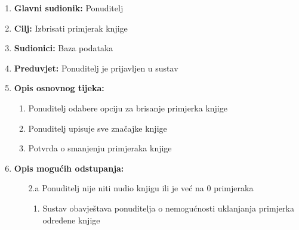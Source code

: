 \noindent {}
\begin{enumerate}
	
	\item \textbf{Glavni sudionik: } Ponuditelj
	\item  \textbf{Cilj:} Izbrisati primjerak knjige
	\item  \textbf{Sudionici:} Baza podataka
	\item  \textbf{Preduvjet:} Ponuditelj je prijavljen u sustav
	\item  \textbf{Opis osnovnog tijeka:}
	
	\begin{enumerate}
		
		\item Ponuditelj odabere opciju za brisanje primjerka knjige
		\item Ponuditelj upisuje sve značajke knjige 
		\item Potvrda o smanjenju primjeraka knjige 
		
	\end{enumerate}
	
	\item  \textbf{Opis mogućih odstupanja:}
	
	\item[] \begin{enumerate}
		
		\item[2.a] Ponuditelj nije niti nudio knjigu ili je već na 0 primjeraka 
		\item[] \begin{enumerate}
			
			\item Sustav obavještava ponuditelja o nemogućnosti uklanjanja primjerka određene knjige
			
		\end{enumerate}
		
	\end{enumerate}
	
\end{enumerate}

